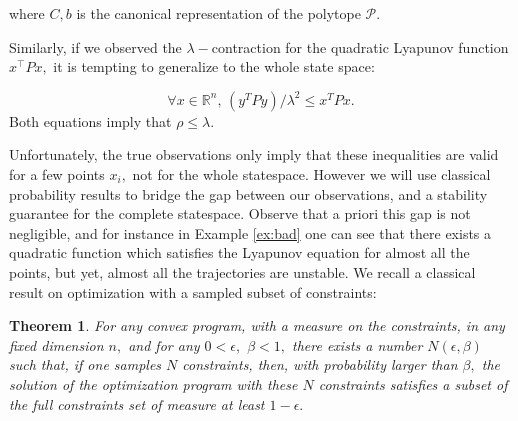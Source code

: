 \documentclass[letterpaper, 10 pt, conference]{ieeeconf}  %
\newcommand{\re}{\mathbb{R}}
\newcommand{\calP}{\mathcal{P}}
\newtheorem{theorem}{Theorem}[section]
\begin{document}
where $C,b$ is the canonical representation of the polytope $\calP.$ 

Similarly, if we observed the $\lambda-$contraction for the quadratic Lyapunov function $x^\top P x,$ it is tempting to generalize to the whole state space:

\begin{equation}\label{eq:cqlf}
\forall{x} \in \re^n,\,  (y^T P y)/\lambda^2 \leq x^TPx.
\end{equation}
Both equations imply that $\rho\leq \lambda.$

Unfortunately, the true observations only imply that these inequalities are valid for a few points $x_i,$ not for the whole statespace. However we will use classical probability results to bridge the gap between our observations, and a stability guarantee for the complete statespace. Observe that a priori this gap is not negligible, and for instance in Example \ref{ex:bad} one can see that there exists a quadratic function which satisfies the Lyapunov equation for almost all the points, but yet, almost all the trajectories are unstable.
We recall a classical result on optimization with a sampled subset of constraints:
\begin{theorem} \cite{calafiore2005uncertain,calafiore2006scenario}\label{thm:campi}
For any convex program, with a measure on the constraints, in any fixed dimension $n,$ and for any $0 < \epsilon,$ $ \beta< 1,$ there exists a number $N(\epsilon, \beta)$ such that, if one samples $N$ constraints, then, with probability larger than $\beta,$ the solution of the optimization program with these $N$ constraints satisfies a subset of the full constraints set of measure at least $1-\epsilon.$
\end{theorem}
\end{document}
